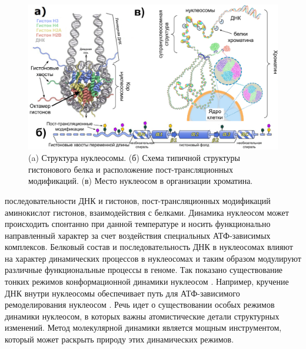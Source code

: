 \begin{figure} [h!]
    \centering
    \includegraphics [width=\textwidth]{images/p2/cosb/part2_1_f1_synopsis.pdf}
    \caption[Структура и вариабельность нуклеосомы]{(a) Структура нуклеосомы. 
    (б) Схема типичной структуры гистонового белка и расположение пост-трансляционных модификаций.
    (в) Место нуклеосом в организации хроматина.}
    \label{fig:part2_1_f1}
\end{figure}

\noindent
последовательности ДНК и гистонов, пост-трансляционных модификаций аминокислот гистонов, взаимодействия с белками. Динамика нуклеосом может происходить спонтанно при данной температуре и носить функционально направленный характер за счет воздействия специальных АТФ-зависимых комплексов. Белковый состав и последовательность ДНК в нуклеосомах влияют на характер динамических процессов в нуклеосомах и таким образом модулируют различные функциональные процессы в геноме. Так показано существование тонких режимов конформационной динамики нуклеосом \cite{armeev_linking_2019}. Например, кручение ДНК внутри нуклеосомы обеспечивает путь для АТФ-зависимого ремоделирования нуклеосом \cite{bowman_remodeling_2019}. Речь идет о существовании особых режимов динамики нуклеосом, в которых важны атомистические детали структурных изменений. Метод молекулярной динамики является мощным инструментом, который может раскрыть природу этих динамических режимов.





